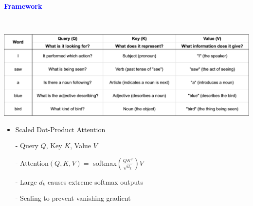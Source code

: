 \documentclass[professionalfont]{beamer}
\begin{document}
\begin{frame}

\begin{center}
    { \textbf{\textcolor{blue}{ {\fontsize{12}{14}\selectfont Framework} }} }
\end{center}
\\[0.2cm]

\begin{center}
    \includegraphics[width=1.0\textwidth]{custom/1.png}
\end{center}

\begin{itemize}
    \item Scaled Dot-Product Attention

    - Query \(Q\), Key \(K\), Value \(V\)

    - Attention\( (Q, K, V) = \) softmax\( (\frac{QK^T}{\sqrt{d_k}})V \)

    - Large \( d_k \) causes extreme softmax outputs

    - Scaling to prevent vanishing gradient
\end{itemize}

\end{frame}
\end{document}
